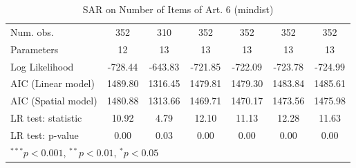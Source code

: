\begin{table}[!h]
\begin{center}
\begin{tabular}{l c c c c c c }
\midrule
Num. obs.               & 352          & 310          & 352          & 352          & 352          & 352          \\
Parameters              & 12           & 13           & 13           & 13           & 13           & 13           \\
Log Likelihood          & -728.44      & -643.83      & -721.85      & -722.09      & -723.78      & -724.99      \\
AIC (Linear model)      & 1489.80      & 1316.45      & 1479.81      & 1479.30      & 1483.84      & 1485.61      \\
AIC (Spatial model)     & 1480.88      & 1313.66      & 1469.71      & 1470.17      & 1473.56      & 1475.98      \\
LR test: statistic      & 10.92        & 4.79         & 12.10        & 11.13        & 12.28        & 11.63        \\
LR test: p-value        & 0.00         & 0.03         & 0.00         & 0.00         & 0.00         & 0.00         \\
\bottomrule
\multicolumn{7}{l}{\scriptsize{$^{***}p<0.001$, $^{**}p<0.01$, $^*p<0.05$}}
\end{tabular}
\caption{SAR on Number of Items of Art. 6 (mindist)}
\label{table:coefficients}
\end{center}
\end{table}
